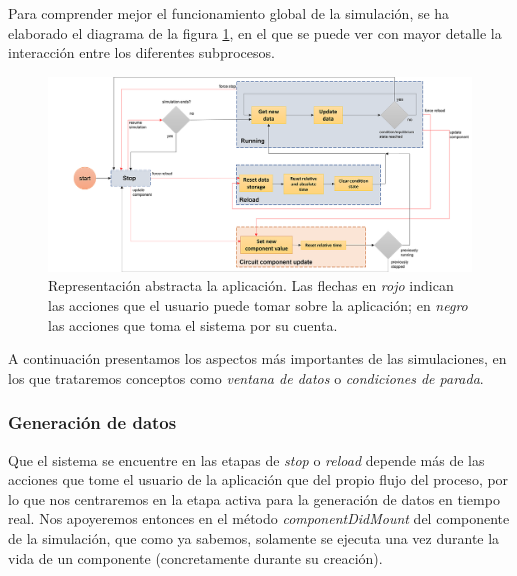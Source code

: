 \documentclass[../main.tex]{subfiles}
\begin{document}
Para comprender mejor el funcionamiento global de la simulación, se ha elaborado el diagrama de la figura \ref{fig::diagrama-algoritmo}, en el que se puede ver con mayor detalle la interacción entre los diferentes subprocesos.\\


\begin{figure}[!h]
    \centering
    \includegraphics[width=\textwidth]{images/diagrama-algoritmo.png}
    \caption{Representación abstracta la aplicación. Las flechas en \textit{rojo} indican las acciones que el usuario puede tomar sobre la aplicación; en \textit{negro} las acciones que toma el sistema por su cuenta. }
    \label{fig::diagrama-algoritmo}
\end{figure}

 A continuación presentamos los aspectos más importantes de las simulaciones, en los que trataremos conceptos como \textit{ventana de datos} o \textit{condiciones de parada}.


\subsubsection{Generación de datos}
Que el sistema se encuentre en las etapas de \textit{stop} o \textit{reload} depende más de las acciones que tome el usuario de la aplicación que del propio flujo del proceso, por lo que nos centraremos en la etapa activa para la generación de datos en tiempo real. Nos apoyeremos entonces en el método \textit{componentDidMount} del componente de la simulación, que como ya sabemos, solamente se ejecuta una vez durante la vida de un componente (concretamente durante su creación). \\
\end{document}
